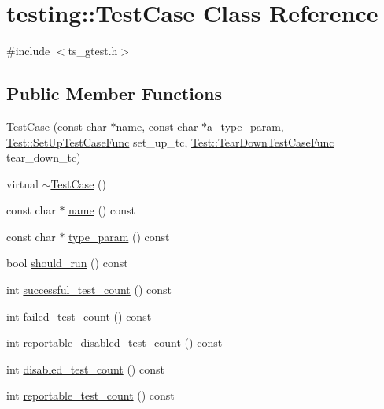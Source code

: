 \hypertarget{classtesting_1_1TestCase}{\section{testing\-:\-:Test\-Case Class Reference}
\label{classtesting_1_1TestCase}
}


{\ttfamily \#include $<$ts\-\_\-gtest.\-h$>$}

\subsection*{Public Member Functions}
\begin{DoxyCompactItemize}
\item 
\hyperlink{classtesting_1_1TestCase_a8a43b04703bfc7d56597fcb9b76ffbf5}{Test\-Case} (const char $\ast$\hyperlink{classtesting_1_1TestCase_af4dfd4ece8e66520a30e6a9fbd9d43aa}{name}, const char $\ast$a\-\_\-type\-\_\-param, \hyperlink{classtesting_1_1Test_a5f2a051d1d99c9b784c666c586186cf9}{Test\-::\-Set\-Up\-Test\-Case\-Func} set\-\_\-up\-\_\-tc, \hyperlink{classtesting_1_1Test_aa0f532e93b9f3500144c53f31466976c}{Test\-::\-Tear\-Down\-Test\-Case\-Func} tear\-\_\-down\-\_\-tc)
\item 
virtual \hyperlink{classtesting_1_1TestCase_ae8afec89feb954cc84317bd92c9b1bbe}{$\sim$\-Test\-Case} ()
\item 
const char $\ast$ \hyperlink{classtesting_1_1TestCase_af4dfd4ece8e66520a30e6a9fbd9d43aa}{name} () const 
\item 
const char $\ast$ \hyperlink{classtesting_1_1TestCase_a2052c095bc6ac9c0ab1cae6f0e2d9fc9}{type\-\_\-param} () const 
\item 
bool \hyperlink{classtesting_1_1TestCase_a0e49de754452943d88e3083e6cdded00}{should\-\_\-run} () const 
\item 
int \hyperlink{classtesting_1_1TestCase_a8fb3974ccb5242ad9d1d633d53c0f730}{successful\-\_\-test\-\_\-count} () const 
\item 
int \hyperlink{classtesting_1_1TestCase_ae74e7a2e75d07f9feca2c3384604cb01}{failed\-\_\-test\-\_\-count} () const 
\item 
int \hyperlink{classtesting_1_1TestCase_a4ec19c0058282562c0cc2c0e87d4b211}{reportable\-\_\-disabled\-\_\-test\-\_\-count} () const 
\item 
int \hyperlink{classtesting_1_1TestCase_ac1e3cd2b598f19ce10e42b3421508a9e}{disabled\-\_\-test\-\_\-count} () const 
\item 
int \hyperlink{classtesting_1_1TestCase_a7693150fa71d460a19b291ed6f5c18bd}{reportable\-\_\-test\-\_\-count} () const 

\end{DoxyCompactItemize}
